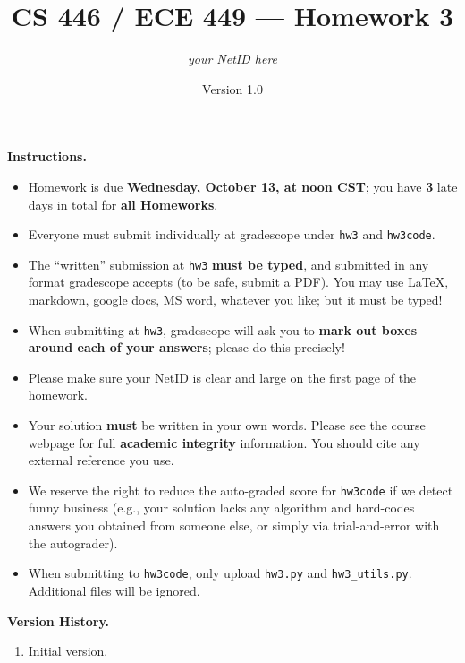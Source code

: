 \documentclass{article}
\title{CS 446 / ECE 449 --- Homework 3}
\author{\emph{your NetID here}}
\date{Version 1.0}
\begin{document}
        \maketitle

        \noindent\textbf{Instructions.}
        \begin{itemize}
          \item
            Homework is due \textbf{Wednesday, October 13, at noon CST}; you have \textbf{3} late days in total for \textbf{all Homeworks}.
        
          \item
            Everyone must submit individually at gradescope under \texttt{hw3} and \texttt{hw3code}.
        
          \item
            The ``written'' submission at \texttt{hw3} \textbf{must be typed}, and submitted in
            any format gradescope accepts (to be safe, submit a PDF).  You may use \LaTeX, markdown,
            google docs, MS word, whatever you like; but it must be typed!
        
          \item
            When submitting at \texttt{hw3}, gradescope will ask you to \textbf{mark out boxes
            around each of your answers}; please do this precisely!
        
          \item
            Please make sure your NetID is clear and large on the first page of the homework.
        
          \item
            Your solution \textbf{must} be written in your own words.
            Please see the course webpage for full \textbf{academic integrity} information.
            You should cite any external reference you use.
        
          \item
            We reserve the right to reduce the auto-graded score for
            \texttt{hw3code} if we detect funny business (e.g., your solution
            lacks any algorithm and hard-codes answers you obtained from
            someone else, or simply via trial-and-error with the autograder).
            
          \item
           When submitting to \texttt{hw3code}, only upload \texttt{hw3.py} and \texttt{hw3\_utils.py}. Additional files will be ignored.
           
        \end{itemize}
        \noindent\textbf{Version History.}
        \begin{enumerate}
            \item Initial version.
        \end{enumerate}
        
\end{document}

